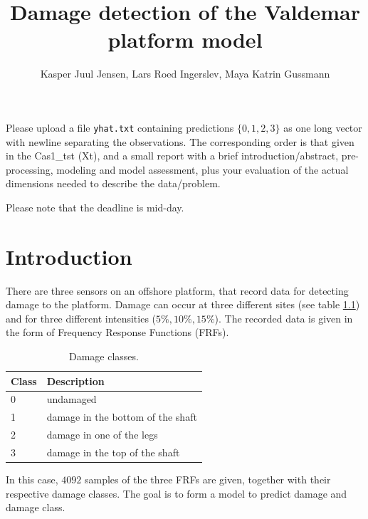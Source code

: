 \documentclass[a4paper,draft=false]{scrreprt}\usepackage[]{graphicx}\usepackage[]{color}
\title{Damage detection of the Valdemar platform model}
\author{Kasper Juul Jensen, Lars Roed Ingerslev, Maya Katrin Gussmann}
\begin{document}
\maketitle



Please upload a file \verb+yhat.txt+ containing predictions $\lbrace 0, 1, 2, 3\rbrace$ as one long vector with newline separating the observations. The corresponding order is that given in the \mbox{Cas1\_tst} (Xt), and a small report with a brief introduction/abstract, pre-processing, modeling and model assessment, plus your evaluation of the actual dimensions needed to describe the data/problem.

Please note that the deadline is mid-day.

\chapter{Introduction} %

There are three sensors on an offshore platform, that record data for detecting damage to the platform. Damage can occur at three different sites (see table \ref{table:damageclass}) and for three different intensities ($5\%, 10\%, 15\%$). The recorded data is given in the form of Frequency Response Functions (FRFs).

\begin{table}[ht]
\begin{center}
\begin{tabular}{ll}
  \hline
  Class & Description\\\hline
  0 & undamaged\\
  1 & damage in the bottom of the shaft\\
  2 & damage in one of the legs\\
  3 & damage in the top of the shaft\\
  \hline
\end{tabular}
\caption{Damage classes.\label{table:damageclass}}
\end{center}
\end{table}

In this case, $4092$ samples of the three FRFs are given, together with their respective damage classes. The goal is to form a model to predict damage and damage class.
\end{document}
